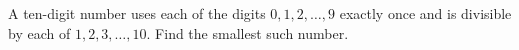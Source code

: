 A ten-digit number uses each of the digits $0,1,2,\dots,9$ exactly once and is divisible by each of $1,2,3,\dots,10$. Find the smallest such number.
